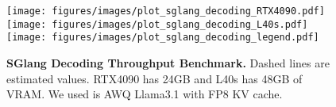 \begin{figure}
\centering
\vspace{0.5em}
\texttt{[image: figures/images/plot\_sglang\_decoding\_RTX4090.pdf]}
\texttt{[image: figures/images/plot\_sglang\_decoding\_L40s.pdf]}
\vspace{0.5em}
\texttt{[image: figures/images/plot\_sglang\_decoding\_legend.pdf]}
\vspace{-2em}
\caption{\textbf{SGlang Decoding Throughput Benchmark.} Dashed lines are estimated values. RTX4090 has 24GB and L40s has 48GB of VRAM. We used is AWQ Llama3.1 with FP8 KV cache.}
\label{fig:sglang_decoding}
\vspace{-1.8em}
\end{figure}